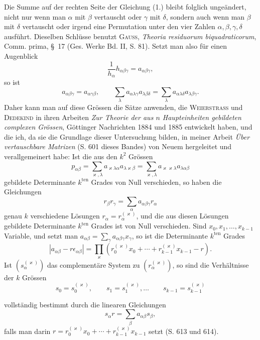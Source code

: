 \documentclass[11pt]{article}
\begin{document}
Die Summe auf der rechten Seite der Gleichung (1.) bleibt folglich ungeändert, nicht nur wenn man $\alpha$ mit $\beta$ vertauscht oder $\gamma$ mit $\delta$, sondern auch wenn man $\beta$ mit $\delta$ vertauscht oder irgend eine Permutation unter den vier Zahlen $\alpha,\beta,\gamma,\delta$ ausführt. Dieselben Schlüsse benutzt \textsc{Gauss}, \emph{Theoria residuorum biquadraticorum}, Comm. prima, \S~17 (Ges. Werke Bd. II, S. 81). Setzt man also für einen Augenblick
\[
\frac{1}{h_\alpha}h_{\alpha\beta\gamma}=a_{\alpha\beta\gamma},
\]
so ist
\begin{equation*}\tag{3.}
a_{\alpha\beta\gamma}=a_{\alpha\gamma\beta},\qquad
\sum_\lambda a_{\alpha\lambda\gamma}a_{\lambda\beta\delta}=\sum_\lambda a_{\alpha\lambda\delta}a_{\lambda\beta\gamma}.
\end{equation*}
Daher kann man auf diese Grössen die Sätze anwenden, die \textsc{Weierstrass} und \textsc{Dedekind} in ihren Arbeiten \emph{Zur Theorie der aus $n$ Haupteinheiten gebildeten complexen Grössen}, Göttinger Nachrichten 1884 und 1885 entwickelt haben, und die ich, da sie die Grundlage dieser Untersuchung bilden, in meiner Arbeit \emph{Über vertauschbare Matrizen} (S. 601 dieses Bandes) von Neuem hergeleitet und verallgemeinert habe: Ist die aus den $k^2$ Grössen
\[
p_{\alpha\beta}=\sum_{\varkappa,\lambda}a_{\varkappa\lambda\alpha}a_{\lambda\varkappa\beta}=\sum_{\varkappa,\lambda}a_{\varkappa\varkappa\lambda}a_{\lambda\alpha\beta}
\]
gebildete Determinante $k^{\text{ten}}$ Grades von Null verschieden, so haben die Gleichungen
\[
r_\beta r_\gamma=\sum_\alpha a_{\alpha\beta\gamma}r_\alpha
\]
genau $k$ verschiedene Lösungen $r_\alpha=r_\alpha^{(\varkappa)}$, und die aus diesen Lösungen gebildete Determinante $k^{\text{ten}}$ Grades ist von Null verschieden. Sind $x_0,x_1,\ldots,x_{k-1}$ Variable, und setzt man $a_{\alpha\beta}=\sum_\gamma a_{\alpha\beta\gamma}x_\gamma$, so ist die Determinante $k^{\text{ten}}$ Grades
\[
\left|a_{\alpha\beta}-r\epsilon_{\alpha\beta}\right|=\prod_\varkappa\left(r_0^{(\varkappa)}x_0+\cdots+r_{k-1}^{(\varkappa)}x_{k-1}-r\right).
\]
Ist $(s_\alpha^{(\varkappa)})$ das complementäre System zu $(r_\alpha^{(\varkappa)})$, so sind die Verhältnisse der $k$ Grössen
\[
s_0=s_0^{(\varkappa)},\qquad s_1=s_1^{(\varkappa)},\ldots\qquad s_{k-1}=s_{k-1}^{(\varkappa)}
\]


vollständig bestimmt durch die linearen Gleichungen
\[
s_\alpha r=\sum_\beta a_{\alpha\beta}s_\beta,
\]
falls man darin $r=r_0^{(\varkappa)}x_0+\cdots+r_{k-1}^{(\varkappa)}x_{k-1}$ setzt (S. 613 und 614).
\end{document}
